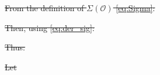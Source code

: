 \documentclass[ba]{imsart}
\newcommand{\der}{\text{\textup{d}}}
\newcommand{\obs}{\mathcal{O}}
\theoremstyle{plain}
\theoremstyle{definition}
\theoremstyle{remark}
\providecommand{\DIFdeltex}[1]{{\protect\color{red}\sout{#1}}}                      %
\providecommand{\DIFdelbegin}{} %
\providecommand{\DIFdel}[1]{\texorpdfstring{\DIFdeltex{#1}}{}} %
\newcommand{\DIFscaledelfig}{0.5}
\newlength{\DIFdelgraphicswidth} %
\newlength{\DIFdelgraphicsheight} %
\newcommand{\DIFdelincludegraphics}[2][]{%
\sbox{\DIFdelgraphicsbox}{\DIFOincludegraphics[#1]{#2}}%
\settoboxwidth{\DIFdelgraphicswidth}{\DIFdelgraphicsbox} %
\settoboxtotalheight{\DIFdelgraphicsheight}{\DIFdelgraphicsbox} %
\scalebox{\DIFscaledelfig}{%
\parbox[b]{\DIFdelgraphicswidth}{\usebox{\DIFdelgraphicsbox}\\[-\baselineskip] \rule{\DIFdelgraphicswidth}{0em}}\llap{\resizebox{\DIFdelgraphicswidth}{\DIFdelgraphicsheight}{%
\setlength{\unitlength}{\DIFdelgraphicswidth}%
\begin{picture}(1,1)%
\thicklines\linethickness{2pt} %
{\color[rgb]{1,0,0}\put(0,0){\framebox(1,1){}}}%
{\color[rgb]{1,0,0}\put(0,0){\line( 1,1){1}}}%
{\color[rgb]{1,0,0}\put(0,1){\line(1,-1){1}}}%
\end{picture}%
}\hspace*{3pt}}} %
} %
\DeclareRobustCommand{\DIFdelbegin}{\DIFOdelbegin \let\includegraphics\DIFdelincludegraphics} %
\begin{document}
\DIFdelbegin %
\DIFdel{From the definition of $\Sigma(\obs)$ \eqref{eq:Sigma}: 
}%


\DIFdel{Then, using \eqref{eq:der_sig}: 
  }%

\DIFdel{Thus:
  }%

\DIFdel{Let
  }%
\end{document}
